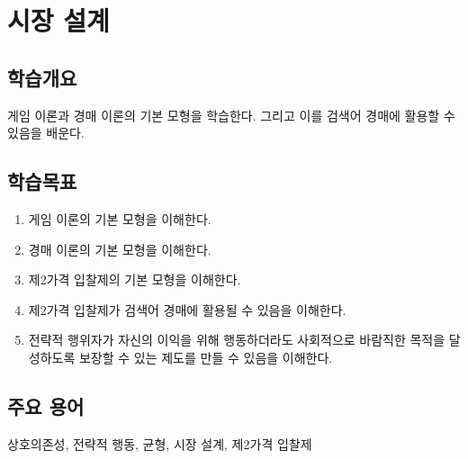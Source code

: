 \chapter{시장 설계}\label{cha:mechanismdesign}

\section*{학습개요}
게임 이론과 경매 이론의 기본 모형을 학습한다. 그리고 이를 검색어 경매에 활용할 수 있음을 배운다.

\section*{학습목표}
\begin{enumerate}
\item 게임 이론의 기본 모형을 이해한다.
\item 경매 이론의 기본 모형을 이해한다.
\item 제2가격 입찰제의 기본 모형을 이해한다.
\item 제2가격 입찰제가 검색어 경매에 활용될 수 있음을 이해한다.
\item 전략적 행위자가 자신의 이익을 위해 행동하더라도 사회적으로 바람직한 목적을 달성하도록 보장할 수 있는 제도를 만들 수 있음을 이해한다.
\end{enumerate}

\section*{주요 용어}
상호의존성, 전략적 행동, 균형, 시장 설계, 제2가격 입찰제

\pagebreak

